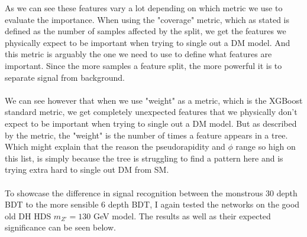 \documentclass[12pt, a4paper]{book}
\begin{document}
\newpage\noindent As we can see these features vary a lot depending on which metric we use to evaluate the importance. 
When using the "coverage" metric, which as stated is defined as the number of samples affected by the split, we get the features we physically expect to be important when trying to single out a DM model.
And this metric is arguably the one we need to use to define what features are important. Since the more samples a feature split, the more powerful it is to separate signal from background.\\
\\We can see however that when we use "weight" as a metric, which is the XGBoost standard metric, we get completely unexpected features that we physically don't expect to be important when trying to single out a DM model.
But as described by the metric, the "weight" is the number of times a feature appears in a tree. Which might explain that the reason the pseudorapidity and $\phi$ range so high on this list, 
is simply because the tree is struggling to find a pattern here and is trying extra hard to single out DM from SM. \\
\\To showcase the difference in signal recognition between the monstrous 30 depth BDT to the more sensible 6 depth BDT, I again tested the networks on the good old DH HDS $m_{Z'}=130$ GeV model.
The results as well as their expected significance can be seen below.
\end{document}
